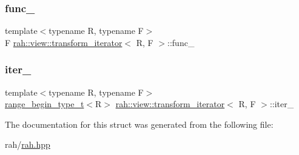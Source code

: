 \subsubsection{\texorpdfstring{func\_}{func\_}}
{\footnotesize\ttfamily template$<$typename R, typename F$>$ \\
F \mbox{\hyperlink{structrah_1_1view_1_1transform__iterator}{rah\+::view\+::transform\+\_\+iterator}}$<$ R, F $>$\+::func\+\_\+}

\mbox{\label{structrah_1_1view_1_1transform__iterator_ac3c20401254ca24682913ba0e9c56284}} 
\subsubsection{\texorpdfstring{iter\_}{iter\_}}
{\footnotesize\ttfamily template$<$typename R, typename F$>$ \\
\mbox{\hyperlink{namespacerah_afa7f59d1f37c7b9d9caed37551be9eaa}{range\+\_\+begin\+\_\+type\+\_\+t}}$<$R$>$ \mbox{\hyperlink{structrah_1_1view_1_1transform__iterator}{rah\+::view\+::transform\+\_\+iterator}}$<$ R, F $>$\+::iter\+\_\+}



The documentation for this struct was generated from the following file\+:\begin{DoxyCompactItemize}
\item 
rah/\mbox{\hyperlink{rah_8hpp}{rah.\+hpp}}\end{DoxyCompactItemize}
